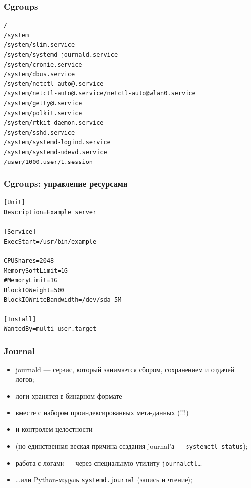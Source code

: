 \documentclass[aspectratio=169]{beamer}
\begin{document}
\begin{frame}[fragile]
  \frametitle{Cgroups}

  \begin{lstlisting}
/
/system
/system/slim.service
/system/systemd-journald.service
/system/cronie.service
/system/dbus.service
/system/netctl-auto@.service
/system/netctl-auto@.service/netctl-auto@wlan0.service
/system/getty@.service
/system/polkit.service
/system/rtkit-daemon.service
/system/sshd.service
/system/systemd-logind.service
/system/systemd-udevd.service
/user/1000.user/1.session
  \end{lstlisting}

\end{frame}


\begin{frame}[fragile]
  \frametitle{Cgroups: управление ресурсами}

  \begin{lstlisting}[caption=/usr/lib/systemd/system/example.service]
[Unit]
Description=Example server

[Service]
ExecStart=/usr/bin/example

CPUShares=2048
MemorySoftLimit=1G
#MemoryLimit=1G
BlockIOWeight=500
BlockIOWriteBandwidth=/dev/sda 5M

[Install]
WantedBy=multi-user.target
  \end{lstlisting}

\end{frame}


\begin{frame}
  \frametitle{Journal}

  \begin{itemize}
  \item journald --- сервис, который занимается сбором, сохранением и отдачей логов;
  \item логи хранятся в бинарном формате
  \item вместе с набором проиндексированных мета-данных (!!!)
  \item и контролем целостности
  \item (но единственная веская причина создания journal'а --- {\tt systemctl status});
  \item работа с логами --- через специальную утилиту {\tt journalctl}\ldots
  \item \ldots или Python-модуль {\tt systemd.journal} (запись и чтение);
  \end{itemize}

\end{frame}
\end{document}
